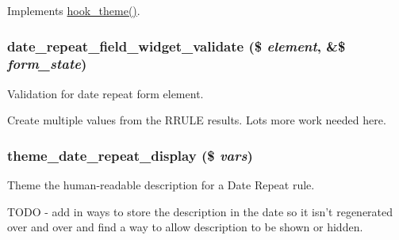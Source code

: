 \label{date__repeat__field_8module_a7c686d7c8b75e0b277263535a9b6fbce}
Implements \hyperlink{group__hooks_ga013ccb45c7aaab1c16cf9691428c910d}{hook\_\-theme()}. \hypertarget{date__repeat__field_8module_aa1797d26d6677578e187b06636d0f9a0}{
\subsubsection[{date\_\-repeat\_\-field\_\-widget\_\-validate}]{\setlength{\rightskip}{0pt plus 5cm}date\_\-repeat\_\-field\_\-widget\_\-validate (\$ {\em element}, \/  \&\$ {\em form\_\-state})}}
\label{date__repeat__field_8module_aa1797d26d6677578e187b06636d0f9a0}
Validation for date repeat form element.

Create multiple values from the RRULE results. Lots more work needed here. \hypertarget{date__repeat__field_8module_aa7f03cf9bae57e4c06944720468a5d7b}{
\subsubsection[{theme\_\-date\_\-repeat\_\-display}]{\setlength{\rightskip}{0pt plus 5cm}theme\_\-date\_\-repeat\_\-display (\$ {\em vars})}}
\label{date__repeat__field_8module_aa7f03cf9bae57e4c06944720468a5d7b}
Theme the human-\/readable description for a Date Repeat rule.

TODO -\/ add in ways to store the description in the date so it isn't regenerated over and over and find a way to allow description to be shown or hidden. 